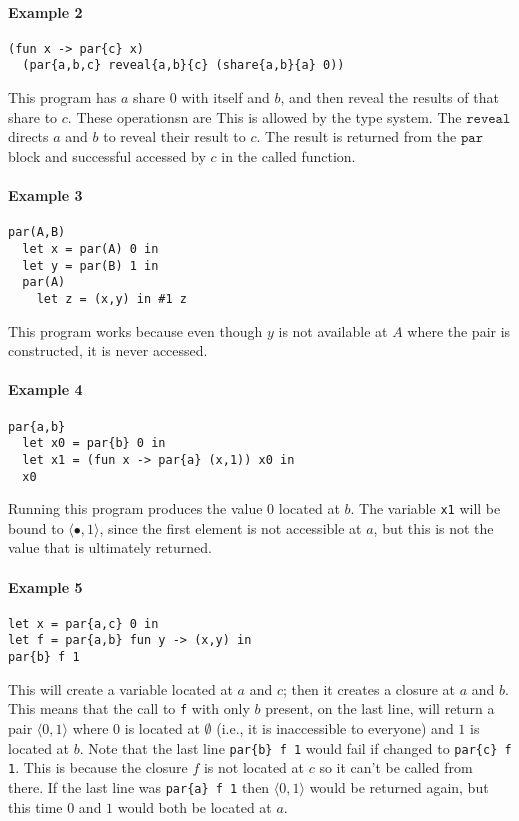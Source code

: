 \documentclass[10pt]{article}
\newcommand{\kw}[1]{\ensuremath{\mathtt{#1}}}
\newcommand{\epair}[2]{\ensuremath{\langle {#1}, {#2} \rangle}}
\newcommand{\vcrash}{\ensuremath{\bullet}}
\begin{document}
\paragraph{Example 2}
\begin{verbatim}
(fun x -> par{c} x) 
  (par{a,b,c} reveal{a,b}{c} (share{a,b}{a} 0))
\end{verbatim}
This program has $a$ share $0$ with itself and $b$, and then reveal
the results of that share to $c$. These operationsn are 
This is allowed by the type system. The $\kw{reveal}$ directs $a$ and
$b$ to reveal their result to $c$. The result is returned from the
$\kw{par}$ block and successful accessed by $c$ in the called function.

\paragraph{Example 3}
\begin{verbatim}
par(A,B) 
  let x = par(A) 0 in
  let y = par(B) 1 in
  par(A) 
    let z = (x,y) in #1 z
\end{verbatim}
This program works because even though $y$ is not available at $A$
where the pair is constructed, it is never accessed.

\paragraph{Example 4}
\begin{verbatim}
par{a,b}
  let x0 = par{b} 0 in
  let x1 = (fun x -> par{a} (x,1)) x0 in
  x0
\end{verbatim}
Running this program produces the value $0$ located at $b$. The
variable \texttt{x1} will be bound to $\epair{\vcrash}{1}$, since the
first element is not accessible at $a$, but this is not the value that
is ultimately returned.

\paragraph{Example 5}
\begin{verbatim}
let x = par{a,c} 0 in
let f = par{a,b} fun y -> (x,y) in
par{b} f 1
\end{verbatim}
This will create a variable located at $a$ and $c$; then it creates a
closure at $a$ and $b$. This means that the call to \texttt{f} with
only $b$ present, on the last line, will return a pair $\epair{0}{1}$
where $0$ is located at $\emptyset$ (i.e., it is inaccessible to
everyone) and $1$ is located at $b$. Note that the last line
\texttt{par\{b\} f 1} would fail if changed to \texttt{par\{c\} f
  1}. This is because the closure $f$ is not located at $c$ so it
can't be called from there. If the last line was \texttt{par\{a\} f 1}
then $\epair{0}{1}$ would be returned again, but this time $0$ and $1$
would both be located at $a$.
\end{document}
